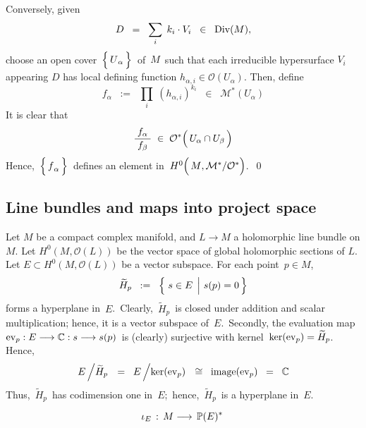 Conversely, given
\begin{equation*}
D
\;\; = \;\;
	\underset{i}{\sum}\;\, k_{i} \cdot V_{i}
\;\; \in \;\;
	\Div(M),
\end{equation*}
choose an open cover \,$\left\{\,\overset{{\color{white}.}}{U}_{\alpha}\,\right\}$\,
of \,$M$\, such that each irreducible hypersurface $V_{i}$ appearing $D$
has local defining function $h_{\alpha,i} \in \mathcal{O}(U_{\alpha})$.
Then, define
\begin{equation*}
f_{\alpha}
\;\; := \;\;
	\underset{i}{\prod}\; (h_{\alpha,i})^{k_{i}}
\;\; \in \;\;
	\mathcal{M}^{*}(U_{\alpha})
\end{equation*}
It is clear that
\begin{equation*}
\dfrac{{\color{white}.}f_{\alpha}{\color{white}.}}{f_{\beta}}
\;\in\;
	\mathcal{O}^{*}\!\left(\,U_{\alpha} \overset{{\color{white}.}}{\cap} U_{\beta}\,\right)
\end{equation*}
Hence,
\,$\left\{\,\overset{{\color{white}.}}{f}_{\alpha}\,\right\}$\,
defines an element in
\,$H^{0}\!\left(\,\overset{{\color{white}.}}{M} , \mathcal{M}^{*}/\mathcal{O}^{*}\right)$.\,
\qed


\vskip 1.0cm
\subsection{Line bundles and maps into project space}

Let $M$ be a compact complex manifold, and $L \longrightarrow M$ a holomorphic line bundle on $M$.
Let $H^{0}(M,\mathcal{O}(L))$ be the vector space of global holomorphic sections of $L$.
Let $E \subset H^{0}(M,\mathcal{O}(L))$ be a vector subspace.
For each point \,$p \in M$,
\begin{equation*}
\widetilde{H}_{p} \;\; := \;\; \left\{\,\left. s \overset{{\color{white}.}}{\in} E \,\;\right\vert\, s(p) = 0\,\right\}
\end{equation*}
forms a hyperplane in \,$E$.\,
Clearly, \,$\widetilde{H}_{p}$\, is closed under addition and scalar multiplication;
hence, it is a vector subspace of \,$E$.\,
Secondly, the evaluation map
\,$\ev_{p} : E \longrightarrow \C : s \longrightarrow s(p)$\,
is (clearly) surjective with kernel
\,$\ker(\ev_{p}) = \widetilde{H}_{p}$.\,
Hence,
\begin{equation*}
E \left/ \widetilde{H}_{p}\right.
\;\; = \;\;
	E \left/ \overset{{\color{white}.}}{\ker}(\ev_{p}) \right.
\;\; \cong \;\;
	\image(\ev_{p})
\;\; = \;\;
	\C
\end{equation*}
Thus, \,$\widetilde{H}_{p}$\, has codimension one in \,$E$;\,
hence, \,$\widetilde{H}_{p}$\, is a hyperplane in \,$E$.\,

\begin{equation*}
\iota_{E} \, : \, M \longrightarrow \, \P(E)^{*}\,
\end{equation*}

